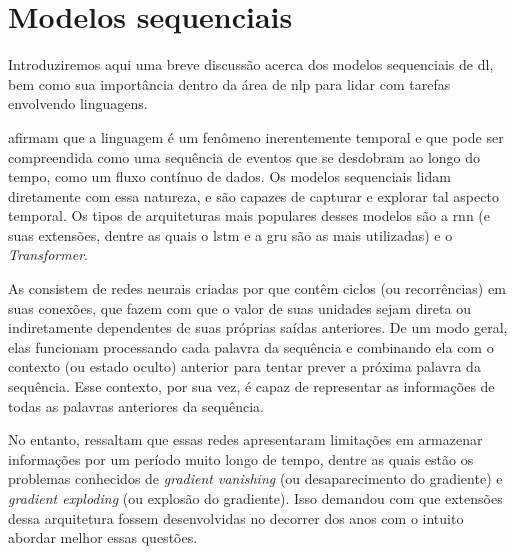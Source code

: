 \section{Modelos sequenciais}
\label{sec:modelos-sequenciais}

Introduziremos aqui uma breve discussão acerca dos modelos sequenciais de \acrlong{dl}, bem como sua importância dentro da área de \acrfull{nlp} para lidar com tarefas envolvendo linguagens.

 afirmam que a linguagem é um fenômeno inerentemente temporal e que pode ser compreendida como uma sequência de eventos que se desdobram ao longo do tempo, como um fluxo contínuo de dados.
Os modelos sequenciais lidam diretamente com essa natureza, e são capazes de capturar e explorar tal aspecto temporal.
Os tipos de arquiteturas mais populares desses modelos são a \acrfull{rnn} (e suas extensões, dentre as quais o \acrfull{lstm} e a \acrfull{gru} são as mais utilizadas) e o \textit{Transformer}.


As  consistem de redes neurais criadas por  que contêm ciclos (ou recorrências) em suas conexões, que fazem com que o valor de suas unidades sejam direta ou indiretamente dependentes de suas próprias saídas anteriores.
De um modo geral, elas funcionam processando cada palavra da sequência e combinando ela com o contexto (ou estado oculto) anterior para tentar prever a próxima palavra da sequência. Esse contexto, por sua vez, é capaz de representar as informações de todas as palavras anteriores da sequência.


No entanto,  ressaltam que essas redes apresentaram limitações em armazenar informações por um período muito longo de tempo, dentre as quais estão os problemas conhecidos de \textit{gradient vanishing} (ou desaparecimento do gradiente) e \textit{gradient exploding} (ou explosão do gradiente). Isso demandou com que extensões dessa arquitetura fossem desenvolvidas no decorrer dos anos com o intuito abordar melhor essas questões.

